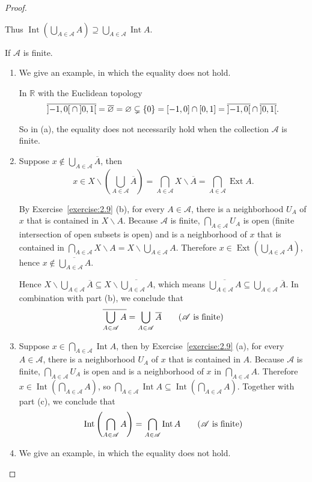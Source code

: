 \begin{proof}
\begin{enumerate}[label={(\alph*)}]
		      Thus $\operatorname{Int}\left(\bigcup_{A\in\mathscr{A}}A\right) \supseteq  \bigcup_{A\in\mathscr{A}}\operatorname{Int}A$.
	\end{enumerate}
	\hfill

	If $\mathscr{A}$ is finite.
	\begin{enumerate}[label={(\alph*)}]
		\item  We give an example, in which the equality does not hold.

		      In $\mathbb{R}$ with the Euclidean topology
		      \[
			      \overline{\left]{-1,0}\right[ \cap \left]{0,1}\right[} = \overline{\varnothing} = \varnothing \subsetneq \{ 0 \} = \left[{-1,0}\right] \cap \left[{0,1}\right] = \overline{\left]{-1,0}\right[}\cap\overline{\left]{0,1}\right[}.
		      \]

		      So in (a), the equality does not necessarily hold when the collection $\mathscr{A}$ is finite.
		\item Suppose $x\notin \bigcup_{A\in\mathscr{A}}\overline{A}$, then
		      \[
			      x\in X\smallsetminus \left(\bigcup_{A\in\mathscr{A}}\overline{A}\right) = \bigcap_{A\in\mathscr{A}}X\smallsetminus\overline{A} = \bigcap_{A\in\mathscr{A}}\operatorname{Ext}A.
		      \]

		      By Exercise~\ref{exercise:2.9} (b), for every $A\in\mathscr{A}$, there is a neighborhood $U_{A}$ of $x$ that is contained in $X\smallsetminus A$. Because $\mathscr{A}$ is finite, $\bigcap_{A\in\mathscr{A}}U_{A}$ is open (finite intersection of open subsets is open) and is a neighborhood of $x$ that is contained in $\bigcap_{A\in\mathscr{A}}X\smallsetminus A = X\smallsetminus\bigcup_{A\in\mathscr{A}}A$. Therefore $x\in \operatorname{Ext}\left({\bigcup_{A\in\mathscr{A}}A}\right)$, hence $x\notin\overline{\bigcup_{A\in\mathscr{A}}A}$.

		      Hence $X\smallsetminus \bigcup_{A\in\mathscr{A}}\overline{A} \subseteq X\smallsetminus \overline{\bigcup_{A\in\mathscr{A}}A}$, which means $\overline{\bigcup_{A\in\mathscr{A}}A}\subseteq \bigcup_{A\in\mathscr{A}}\overline{A}$. In combination with part (b), we conclude that
		      \[
			      \overline{\bigcup_{A\in\mathscr{A}}A} = \bigcup_{A\in\mathscr{A}}\overline{A} \tag{$\mathscr{A}$ is finite}
		      \]
		\item Suppose $x\in \bigcap_{A\in\mathscr{A}}\operatorname{Int}A$, then by Exercise~\ref{exercise:2.9} (a), for every $A\in\mathscr{A}$, there is a neighborhood $U_{A}$ of $x$ that is contained in $A$. Because $\mathscr{A}$ is finite, $\bigcap_{A\in\mathscr{A}}U_{A}$ is open and is a neighborhood of $x$ in $\bigcap_{A\in\mathscr{A}}A$. Therefore $x\in \operatorname{Int}\left(\bigcap_{A\in\mathscr{A}}A\right)$, so $\bigcap_{A\in\mathscr{A}}\operatorname{Int}A \subseteq \operatorname{Int}\left(\bigcap_{A\in\mathscr{A}}A\right)$. Together with part (c), we conclude that
		      \[
			      \operatorname{Int}\left(\bigcap_{A\in\mathscr{A}}A\right) = \bigcap_{A\in\mathscr{A}}\operatorname{Int}A \tag{$\mathscr{A}$ is finite}
		      \]
		\item We give an example, in which the equality does not hold.


\end{enumerate}
\end{proof}
